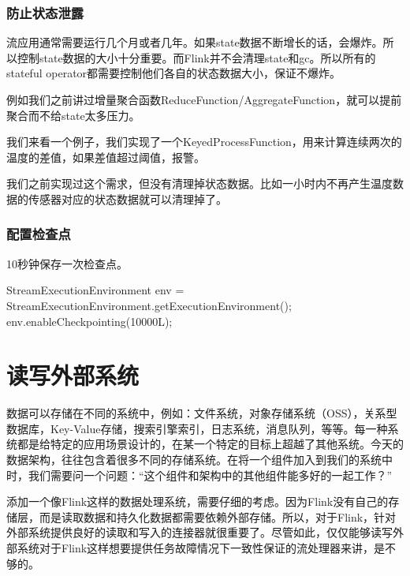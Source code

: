 \documentclass[cn,11pt,chinese]{elegantbook}
\newenvironment{Shaded}{}{}
\newcommand{\DecValTok}[1]{\textcolor[rgb]{0.25,0.63,0.44}{#1}}
\newcommand{\FunctionTok}[1]{\textcolor[rgb]{0.02,0.16,0.49}{#1}}
\newcommand{\NormalTok}[1]{#1}
\begin{document}
\hypertarget{ux9632ux6b62ux72b6ux6001ux6cc4ux9732}{%
\subsection{防止状态泄露}\label{ux9632ux6b62ux72b6ux6001ux6cc4ux9732}}

流应用通常需要运行几个月或者几年。如果state数据不断增长的话，会爆炸。所以控制state数据的大小十分重要。而Flink并不会清理state和gc。所以所有的stateful
operator都需要控制他们各自的状态数据大小，保证不爆炸。

例如我们之前讲过增量聚合函数ReduceFunction/AggregateFunction，就可以提前聚合而不给state太多压力。

我们来看一个例子，我们实现了一个KeyedProcessFunction，用来计算连续两次的温度的差值，如果差值超过阈值，报警。

我们之前实现过这个需求，但没有清理掉状态数据。比如一小时内不再产生温度数据的传感器对应的状态数据就可以清理掉了。

\hypertarget{ux914dux7f6eux68c0ux67e5ux70b9}{%
\subsection{配置检查点}\label{ux914dux7f6eux68c0ux67e5ux70b9}}

10秒钟保存一次检查点。

\begin{Shaded}
\begin{Highlighting}[]
\NormalTok{StreamExecutionEnvironment env = StreamExecutionEnvironment.}\FunctionTok{getExecutionEnvironment}\NormalTok{();}
\NormalTok{env.}\FunctionTok{enableCheckpointing}\NormalTok{(}\DecValTok{10000L}\NormalTok{);}
\end{Highlighting}
\end{Shaded}

\hypertarget{ux8bfbux5199ux5916ux90e8ux7cfbux7edf}{%
\chapter{读写外部系统}\label{ux8bfbux5199ux5916ux90e8ux7cfbux7edf}}

数据可以存储在不同的系统中，例如：文件系统，对象存储系统（OSS），关系型数据库，Key-Value存储，搜索引擎索引，日志系统，消息队列，等等。每一种系统都是给特定的应用场景设计的，在某一个特定的目标上超越了其他系统。今天的数据架构，往往包含着很多不同的存储系统。在将一个组件加入到我们的系统中时，我们需要问一个问题：``这个组件和架构中的其他组件能多好的一起工作？''

添加一个像Flink这样的数据处理系统，需要仔细的考虑。因为Flink没有自己的存储层，而是读取数据和持久化数据都需要依赖外部存储。所以，对于Flink，针对外部系统提供良好的读取和写入的连接器就很重要了。尽管如此，仅仅能够读写外部系统对于Flink这样想要提供任务故障情况下一致性保证的流处理器来讲，是不够的。
\end{document}
